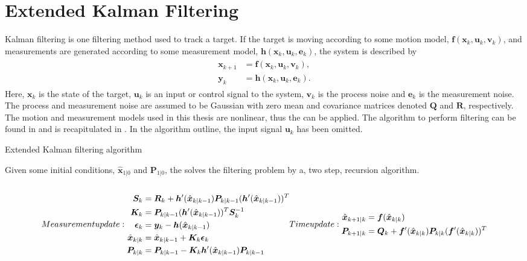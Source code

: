 \newpage

\section{Extended Kalman Filtering}
Kalman filtering \cite{Gustafsson:2012} is one filtering method used to track a target.
If the target is moving according to some motion model, $\bm{f}(\bm{x}_k,\bm{u}_k,\bm{v}_k)$, and measurements are generated according to some measurement model, $\bm{h}(\bm{x}_k,\bm{u}_k,\bm{e}_k)$, the system is described by
\begin{align}
\begin{split}
	\bm{x}_{k+1} &= \bm{f}(\bm{x}_k,\bm{u}_k,\bm{v}_k), \\
	\bm{y}_k &= \bm{h}(\bm{x}_k,\bm{u}_k,\bm{e}_k).
\end{split}
\end{align}
Here, $\bm{x}_k$ is the state of the target, $\bm{u}_k$ is an input or control signal to the system, $\bm{v}_k$ is the process noise and $\bm{e}_k$ is the measurement noise.
The process and measurement noise are assumed to be Gaussian with zero mean and covariance matrices denoted $\bm{Q}$ and $\bm{R}$, respectively.
The motion and measurement models used in this thesis are nonlinear, thus the \abbrEKF can be applied.
The algorithm to perform \abbrEKF filtering can be found in \cite{Gustafsson:2012} and is recapitulated in .
In the algorithm outline, the input signal $\bm{u}_k$ has been omitted.

\begin{algorithm}
	\caption{\label{algo:ekf} Extended Kalman filtering algorithm}
	Given some initial conditions, $\hat{\bm{x}}_{1|0}$ and $\bm{P}_{1|0}$, the \abbrEKF solves the filtering problem by a, two step, recursion algorithm. \\ \\
	\begin{subequations}
	Measurement update:
	\begin{align}
		\bm{S}_k &= \bm{R}_k + \bm{h}^\prime(\hat{\bm{x}}_ {k|k-1}) \bm{P}_{k|k-1} (\bm{h}^\prime(\hat{\bm{x}}_ {k|k-1}))^T \\
		\bm{K}_k &= \bm{P}_{k|k-1} (\bm{h}^\prime(\hat{\bm{x}}_ {k|k-1}))^T \bm{S}_k^{-1} \\
		\bm{\epsilon}_k &= \bm{y}_k - \bm{h}(\hat{\bm{x}}_{k|k-1}) \\
		\hat{\bm{x}}_{k|k} &= \hat{\bm{x}}_{k|k-1} + \bm{K}_k \bm{\epsilon}_k \\
		\bm{P}_{k|k} &= \bm{P}_{k|k-1} - \bm{K}_k \bm{h}^\prime(\hat{\bm{x}}_{k|k-1}) \bm{P}_{k|k-1}
	\end{align}
	\\
	Time update:
	\begin{align}
		\hat{\bm{x}}_{k+1|k} &= \bm{f}(\hat{\bm{x}}_{k|k}) \\
		\bm{P}_{k+1|k} &= \bm{Q}_k + \bm{f}^\prime(\hat{\bm{x}}_{k|k}) \bm{P}_{k|k} (\bm{f}^\prime(\hat{\bm{x}}_{k|k}))^T
	\end{align}
	\end{subequations}
\end{algorithm}

